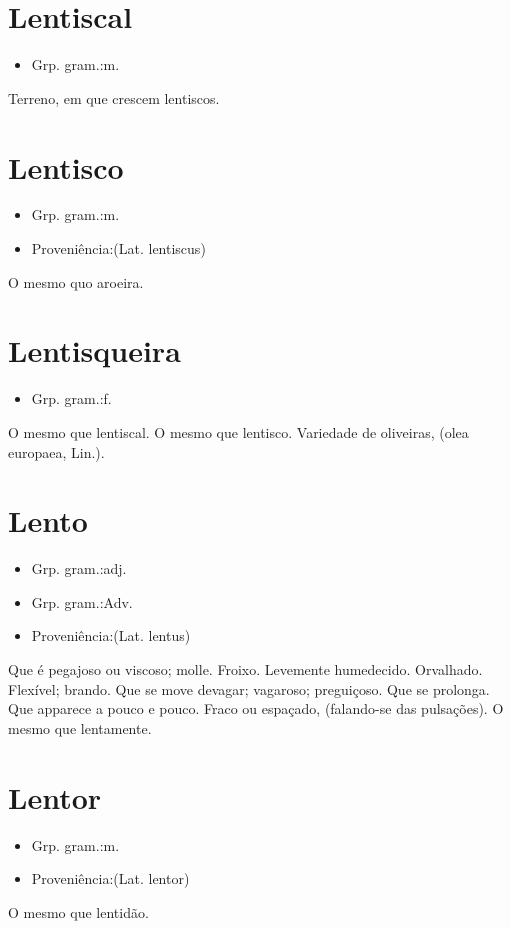\section{Lentiscal}
\begin{itemize}
\item {Grp. gram.:m.}
\end{itemize}
Terreno, em que crescem lentiscos.
\section{Lentisco}
\begin{itemize}
\item {Grp. gram.:m.}
\end{itemize}
\begin{itemize}
\item {Proveniência:(Lat. \textunderscore lentiscus\textunderscore )}
\end{itemize}
O mesmo quo \textunderscore aroeira\textunderscore .
\section{Lentisqueira}
\begin{itemize}
\item {Grp. gram.:f.}
\end{itemize}
O mesmo que \textunderscore lentiscal\textunderscore .
O mesmo que \textunderscore lentisco\textunderscore .
Variedade de oliveiras, (\textunderscore olea europaea\textunderscore , Lin.).
\section{Lento}
\begin{itemize}
\item {Grp. gram.:adj.}
\end{itemize}
\begin{itemize}
\item {Grp. gram.:Adv.}
\end{itemize}
\begin{itemize}
\item {Proveniência:(Lat. \textunderscore lentus\textunderscore )}
\end{itemize}
Que é pegajoso ou viscoso; molle.
Froixo.
Levemente humedecido.
Orvalhado.
Flexível; brando.
Que se move devagar; vagaroso; preguiçoso.
Que se prolonga.
Que apparece a pouco e pouco.
Fraco ou espaçado, (falando-se das pulsações).
O mesmo que \textunderscore lentamente\textunderscore .
\section{Lentor}
\begin{itemize}
\item {Grp. gram.:m.}
\end{itemize}
\begin{itemize}
\item {Proveniência:(Lat. \textunderscore lentor\textunderscore )}
\end{itemize}
O mesmo que \textunderscore lentidão\textunderscore .
